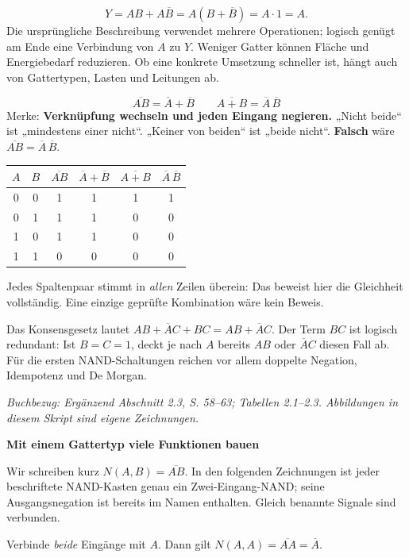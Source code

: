 \documentclass[10pt,a4paper]{article}
\newcommand{\titlepagepart}[2]{\vspace*{-4mm}{\sffamily\small #1}\par{\sffamily\LARGE\bfseries #2}\par\vspace{2mm}}
\newcommand{\block}[1]{\par\vspace{2mm}{\sffamily\large\bfseries #1}\par}
\newcommand{\source}[1]{\par{\footnotesize\itshape Buchbezug: #1. Abbildungen in diesem Skript sind eigene Zeichnungen.}}
\begin{document}
\block{Warum vereinfachen?}
\[Y=AB+A\overline B=A(B+\overline B)=A\cdot1=A.\]
Die ursprüngliche Beschreibung verwendet mehrere Operationen; logisch genügt
am Ende eine Verbindung von $A$ zu $Y$. Weniger Gatter können Fläche und
Energiebedarf reduzieren. Ob eine konkrete Umsetzung schneller ist, hängt auch
von Gattertypen, Lasten und Leitungen ab.

\block{De Morgan: Negation über eine Verknüpfung ziehen}
\[
\boxed{\overline{AB}=\overline A+\overline B}\qquad
\boxed{\overline{A+B}=\overline A\,\overline B}
\]
Merke: \textbf{Verknüpfung wechseln und jeden Eingang negieren.}
„Nicht beide“ ist „mindestens einer nicht“.
„Keiner von beiden“ ist „beide nicht“.
\textbf{Falsch} wäre $\overline{AB}=\overline A\,\overline B$.

\begin{center}
\begin{tabular}{cc|cc|cc}\toprule
$A$&$B$&$\overline{AB}$&$\overline A+\overline B$&$\overline{A+B}$&$\overline A\,\overline B$\\\midrule
0&0&1&1&1&1\\
0&1&1&1&0&0\\
1&0&1&1&0&0\\
1&1&0&0&0&0\\\bottomrule
\end{tabular}
\end{center}
Jedes Spaltenpaar stimmt in \emph{allen} Zeilen überein: Das beweist hier die
Gleichheit vollständig. Eine einzige geprüfte Kombination wäre kein Beweis.

\block{Weitere Buchregel zum Nachschlagen}
Das Konsensgesetz lautet $AB+\overline A C+BC=AB+\overline A C$.
Der Term $BC$ ist logisch redundant: Ist $B=C=1$, deckt je nach $A$ bereits
$AB$ oder $\overline A C$ diesen Fall ab. Für die ersten NAND-Schaltungen
reichen vor allem doppelte Negation, Idempotenz und De Morgan.
\source{Ergänzend Abschnitt 2.3, S. 58--63; Tabellen 2.1--2.3}

\newpage
\titlepagepart{04 / NAND ALS BAUSTEIN}{Mit einem Gattertyp viele Funktionen bauen}
Wir schreiben kurz $N(A,B)=\overline{AB}$. In den folgenden Zeichnungen ist
jeder beschriftete NAND-Kasten genau ein Zwei-Eingang-NAND; seine Ausgangsnegation
ist bereits im Namen enthalten. Gleich benannte Signale sind verbunden.

\block{NOT aus einem NAND}
Verbinde \emph{beide} Eingänge mit $A$. Dann gilt
$N(A,A)=\overline{AA}=\overline A$.
\begin{center}
\end{center}
\end{document}
